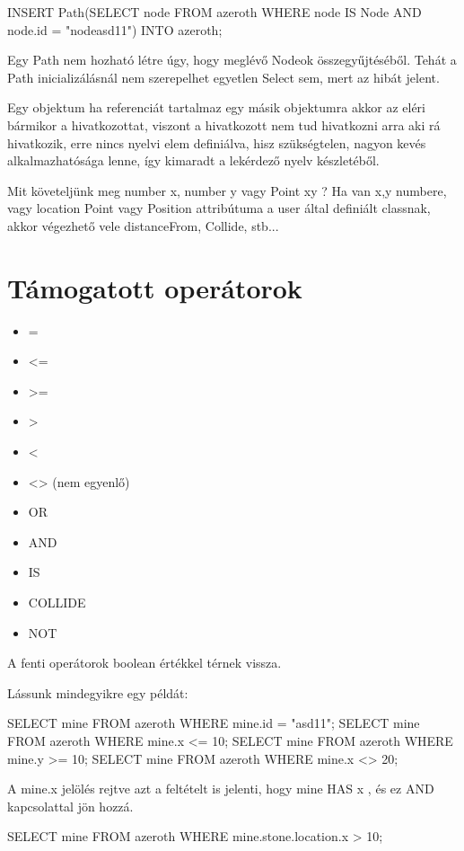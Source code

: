 \begin{itemize}
\begin{sql}
INSERT Path(SELECT node FROM azeroth WHERE node IS Node AND node.id = "nodeasd11") INTO azeroth;
\end{sql}

Egy Path nem hozható létre úgy, hogy  meglévő Nodeok összegyűjtéséből. Tehát a Path inicializálásnál nem szerepelhet egyetlen Select sem, mert az hibát jelent.

Egy objektum ha referenciát tartalmaz egy másik objektumra akkor az eléri bármikor a hivatkozottat, viszont a hivatkozott nem tud hivatkozni arra aki rá hivatkozik, erre nincs nyelvi elem definiálva, hisz szükségtelen, nagyon kevés alkalmazhatósága lenne, így kimaradt a lekérdező nyelv készletéből.

Mit követeljünk meg number x, number y vagy Point xy ?
Ha van x,y numbere, vagy location Point vagy Position attribútuma a user által definiált classnak, akkor végezhető vele distanceFrom, Collide, stb...

\end{itemize}

\section{Támogatott operátorok}
\begin{itemize}
\item = 
\item <= 
\item >= 
\item > 
\item < 
\item <> (nem egyenlő) 
\item OR 
\item AND 
\item IS 
\item COLLIDE
\item NOT
\end{itemize}

A fenti operátorok boolean értékkel térnek vissza.

Lássunk mindegyikre egy példát:
\begin{sql}
SELECT mine FROM azeroth WHERE mine.id = "asd11";
SELECT mine FROM azeroth WHERE mine.x <= 10;
SELECT mine FROM azeroth WHERE mine.y >= 10;
SELECT mine FROM azeroth WHERE mine.x <> 20;
\end{sql}

A mine.x jelölés rejtve azt a feltételt is jelenti, hogy mine HAS x , és ez AND kapcsolattal jön hozzá.
\begin{sql}
SELECT mine FROM azeroth WHERE mine.stone.location.x > 10;
\end{sql}

